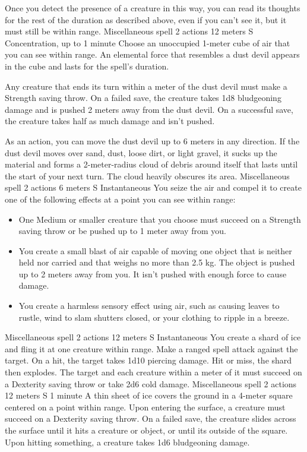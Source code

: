     Once you detect the presence of a creature in this way, you can read its thoughts for the rest of the duration as described above, even if you can't see it, but it must still be within range.
    {Miscellaneous spell}
    {2 actions}
    {12 meters}
    {S}
    {Concentration, up to 1 minute}
    Choose an unoccupied 1-meter cube of air that you can see within range.
    An elemental force that resembles a dust devil appears in the cube and lasts for the spell's duration.

    Any creature that ends its turn within a meter of the dust devil must make a Strength saving throw.
    On a failed save, the creature takes 1d8 bludgeoning damage and is pushed 2 meters away from the dust devil.
    On a successful save, the creature takes half as much damage and isn't pushed.

    As an action, you can move the dust devil up to 6 meters in any direction.
    If the dust devil moves over sand, dust, loose dirt, or light gravel, it sucks up the material and forms a 2-meter-radius cloud of debris around itself that lasts until the start of your next turn.
    The cloud heavily obscures its area.
    {Miscellaneous spell}
    {2 actions}
    {6 meters}
    {S}
    {Instantaneous}
    You seize the air and compel it to create one of the following effects at a point you can see within range:
    \begin{itemize}
        \item One Medium or smaller creature that you choose must succeed on a Strength saving throw or be pushed up to 1 meter away from you.
        \item You create a small blast of air capable of moving one object that is neither held nor carried and that weighs no more than 2.5 kg.
        The object is pushed up to 2 meters away from you.
        It isn't pushed with enough force to cause damage.
        \item You create a harmless sensory effect using air, such as causing leaves to rustle, wind to slam shutters closed, or your clothing to ripple in a breeze.
    \end{itemize}
    {Miscellaneous spell}
    {2 actions}
    {12 meters}
    {S}
    {Instantaneous}
    You create a shard of ice and fling it at one creature within range.
    Make a ranged spell attack against the target.
    On a hit, the target takes 1d10 piercing damage.
    Hit or miss, the shard then explodes.
    The target and each creature within a meter of it must succeed on a Dexterity saving throw or take 2d6 cold damage.
    {Miscellaneous spell}
    {2 actions}
    {12 meters}
    {S}
    {1 minute}
    A thin sheet of ice covers the ground in a 4-meter square centered on a point within range.
    Upon entering the surface, a creature must succeed on a Dexterity saving throw.
    On a failed save, the creature slides across the surface until it hits a creature or object, or until its outside of the square.
    Upon hitting something, a creature takes 1d6 bludgeoning damage.

